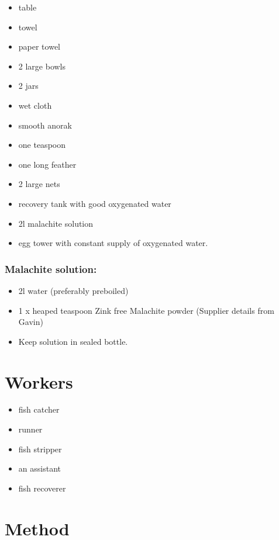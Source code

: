 \begin{itemize}
\item table  
\item towel  
\item paper towel 
\item 2  large bowls  
\item 2 jars 
\item wet cloth  
\item smooth anorak 
\item one teaspoon 
\item one long feather
\item 2  large nets  
\item recovery tank with good oxygenated water
\item 2l malachite solution
\item egg tower with constant supply of oxygenated water.
\end{itemize}

\subsubsection{Malachite solution: }

                  \begin{itemize}
                  \item 2l water (preferably preboiled)
                  \item 1 x heaped teaspoon Zink free Malachite powder (Supplier details from Gavin)
                  \item Keep solution in sealed bottle.
                  \end{itemize}


\section{Workers}
\begin{itemize}
\item fish catcher 
\item runner 
\item fish stripper  
\item an assistant 
\item fish recoverer
\end{itemize}

                                       

\section{Method}

